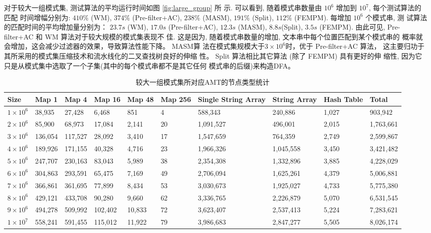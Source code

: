 \documentclass{ws-ijprai}
\begin{document}
对于较大一组模式集, 测试算法的平均运行时间如图 \ref{fig:large_group} 所
示. 可以看到, 随着模式串数量由 $10^6$ 增加到 $10^7$, 每个测试算法的匹配
时间增幅分别为: $410\%$ (\textsf{WM}), $374\%$
(\textsf{Pre-filter+AC}), $238\%$ (\textsf{MASM}), $191\%$
(\textsf{Split}), $112\%$ (\textsf{FEMPM}). 每增加 $10^6$ 个模式串, 测
试算法的匹配时间的平均增加量分别为： $23.7s$ (\textsf{WM}), $17.0s$
(\textsf{Pre-filter+AC}), $12.3s$ (\textsf{MASM}),
$8.8s$(\textsf{Split}), $3.5s$ (\textsf{FEMPM}). 由此可见,
\textsf{Pre-filter+AC} 和 \textsf{WM} 算法对于较大规模的模式集表现不
佳. 这是因为, 随着模式串数量的增加, 文本串中每个位置匹配到某个模式串的
概率就会增加，这会减少过滤器的效果，导致算法性能下降。 \textsf{MASM}算
法在模式集规模大于$3 \times 10^6$时，优于 \textsf{Pre-filter+AC} 算法，
这主要归功于其所采用的模式集压缩技术和流水线化的二叉查找树良好的伸缩
性。 \textsf{Split} 算法相比其它算法 (除了 \textsf{FEMPM}) 具有更好的伸
缩性, 因为它只是从模式集中选取了一个子集(其中的每个模式串都不是其它任何
模式串的后缀)来构造DFA。

\begin{table}[!htp]
  \caption{较大一组模式集所对应AMT的节点类型统计}
  \scriptsize
  \label{tab:large_group}
  \begin{tabular}{p{25pt}p{25pt}p{25pt}p{25pt}p{20pt}p{10pt}p{30pt}p{30pt}p{20pt}p{25pt}}
 \hline
 Size &
 Map 1 &
 Map 4 &
 Map 16 &
 Map 48 &
 Map 256 &
 Single String Array &
 String Array   &
 Hash Table &
 Total\\
\hline
$1 \times 10^6$ &  38,935 &   27,428  &   6,468 &     851   &    4 &    588,343  &    240,886 &  1,027 &    903,942  \\
$2 \times 10^6$ &  85,900 &   68,973  &  17,084 &   2,141   &   20 &  1,091,527  &    496,001 &  2,015 &  1,763,661  \\
$3 \times 10^6$ & 136,054 &  117,527  &  28,092 &   3,410   &   17 &  1,547,659  &    764,359 &  2,749 &  2,599,867  \\
$4 \times 10^6$ & 189,926 &  171,155  &  40,328 &   4,716   &   23 &  1,966,326  &  1,045,558 &  3,450 &  3,421,482  \\
$5 \times 10^6$ & 247,707 &  230,163  &  83,043 &   5,989   &  38 &  2,354,308   &  1,332,896 &  3,885 &  4,228,029  \\
$6 \times 10^6$ & 304,863 &  293,591  &  65,475 &   7,169   &   49 &  2,706,094  &  1,625,261 &  4,379 &  5,006,881  \\
$7 \times 10^6$ & 366,861 &  361,695  &  77,899 &   8,434   &   53 &  3,030,673  &  1,925,027 &  4,733 &  5,775,380  \\
$8 \times 10^6$ & 429,121 &  433,708  &  90,280 &   9,660   &   62 &  3,336,765  &  2,226,879 &  5,070 &  6,531,545  \\
$9 \times 10^6$ & 494,278 &  509,992  & 102,402 &  10,833   &   72 &  3,623,407  &  2,537,413 &  5,224 &  7,283,621  \\
$1 \times 10^7$ & 558,241 &  591,455  & 115,012 &  11,922   &   79 &  3,986,683  &  2,847,277 &  5,505 &  8,026,174  \\
\hline
\end{tabular}
\end{table}
\end{document}
